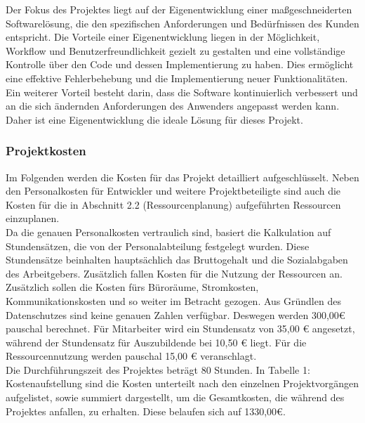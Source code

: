 \begin{flushleft}
	Der Fokus des Projektes liegt auf der Eigenentwicklung einer maßgeschneiderten Softwarelösung, die den spezifischen Anforderungen und Bedürfnissen des Kunden entspricht. Die Vorteile einer Eigenentwicklung liegen in der Möglichkeit, Workflow und Benutzerfreundlichkeit gezielt zu gestalten und eine vollständige Kontrolle über den Code und dessen Implementierung zu haben. Dies ermöglicht eine effektive Fehlerbehebung und die Implementierung neuer Funktionalitäten. Ein weiterer Vorteil besteht darin, dass die Software kontinuierlich verbessert und an die sich ändernden Anforderungen des Anwenders angepasst werden kann. Daher ist eine Eigenentwicklung die ideale Lösung für dieses Projekt.

	\subsubsection{Projektkosten}
	Im Folgenden werden die Kosten für das Projekt detailliert aufgeschlüsselt. Neben den Personalkosten für Entwickler und weitere Projektbeteiligte sind auch die Kosten für die in Abschnitt 2.2 (Ressourcenplanung) aufgeführten Ressourcen einzuplanen.
	\\
	Da die genauen Personalkosten vertraulich sind, basiert die Kalkulation auf Stundensätzen, die von der Personalabteilung festgelegt wurden. Diese Stundensätze beinhalten hauptsächlich das Bruttogehalt und die Sozialabgaben des Arbeitgebers. Zusätzlich fallen Kosten für die Nutzung der Ressourcen an.
	\\
	Zusätzlich sollen die Kosten fürs Büroräume, Stromkosten,
	Kommunikationskosten und so weiter im Betracht gezogen.
	Aus Gründlen des Datenschutzes sind keine genauen Zahlen verfügbar.
	Deswegen werden 300,00€ pauschal berechnet.
	Für Mitarbeiter wird ein Stundensatz von 35,00 € angesetzt,
	während der Stundensatz für Auszubildende bei 10,50 € liegt.
	Für die Ressourcennutzung werden pauschal 15,00 € veranschlagt.
	\\
	Die Durchführungszeit des Projektes beträgt 80 Stunden. In Tabelle 1: Kostenaufstellung sind die
	Kosten unterteilt nach den einzelnen Projektvorgängen aufgelistet, sowie summiert dargestellt, um die
	Gesamtkosten, die während des Projektes anfallen, zu erhalten. Diese belaufen sich auf 1330,00€.


\end{flushleft}
